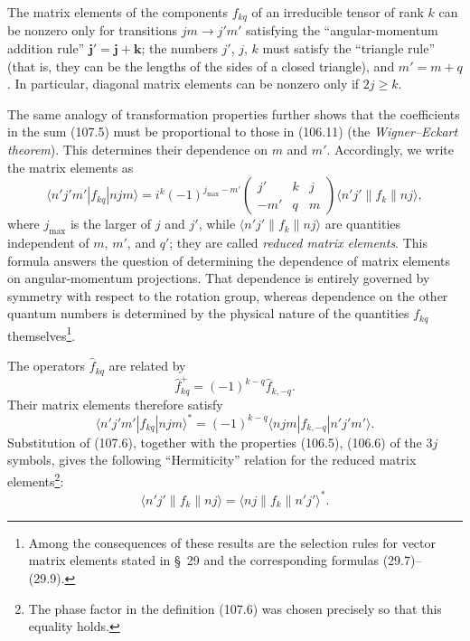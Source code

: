 The matrix elements of the components $f_{kq}$ of an irreducible tensor of rank $k$ can be nonzero only for transitions $jm\to j'm'$ satisfying the ``angular-momentum addition rule'' $\mathbf j'=\mathbf j+\mathbf k$; the numbers $j'$, $j$, $k$ must satisfy the ``triangle rule'' (that is, they can be the lengths of the sides of a closed triangle), and $m'=m+q$. In particular, diagonal matrix elements can be nonzero only if $2j\geqslant k$.

The same analogy of transformation properties further shows that the coefficients in the sum (107.5) must be proportional to those in (106.11) (the \emph{Wigner--Eckart theorem}). This determines their dependence on $m$ and $m'$. Accordingly, we write the matrix elements as
\begin{equation}
 \langle n'j'm'|f_{kq}|njm\rangle=i^k(-1)^{j_{\max}-m'}
 \begin{pmatrix}j'&k&j\\-m'&q&m\end{pmatrix}
 \langle n'j'\|f_k\|nj\rangle,
 \tag{107.6}
\end{equation}
where $j_{\max}$ is the larger of $j$ and $j'$, while $\langle n'j'\|f_k\|nj\rangle$ are quantities independent of $m$, $m'$, and $q'$; they are called \emph{reduced matrix elements}. This formula answers the question of determining the dependence of matrix elements on angular-momentum projections. That dependence is entirely governed by symmetry with respect to the rotation group, whereas dependence on the other quantum numbers is determined by the physical nature of the quantities $f_{kq}$ themselves\footnote{Among the consequences of these results are the selection rules for vector matrix elements stated in \S~29 and the corresponding formulas (29.7)--(29.9).}.

The operators $\widehat f_{kq}$ are related by
\begin{equation}
 \widehat f_{kq}^{+}=(-1)^{k-q}\widehat f_{k,-q}.
 \tag{107.7}
\end{equation}
Their matrix elements therefore satisfy
\begin{equation}
 \langle n'j'm'|f_{kq}|njm\rangle^{*}=(-1)^{k-q}\langle njm|f_{k,-q}|n'j'm'\rangle.
 \tag{107.8}
\end{equation}
Substitution of (107.6), together with the properties (106.5), (106.6) of the $3j$ symbols, gives the following ``Hermiticity'' relation for the reduced matrix elements\footnote{The phase factor in the definition (107.6) was chosen precisely so that this equality holds.}:
\begin{equation}
 \langle n'j'\|f_k\|nj\rangle=\langle nj\|f_k\|n'j'\rangle^{*}.
 \tag{107.9}
\end{equation}


